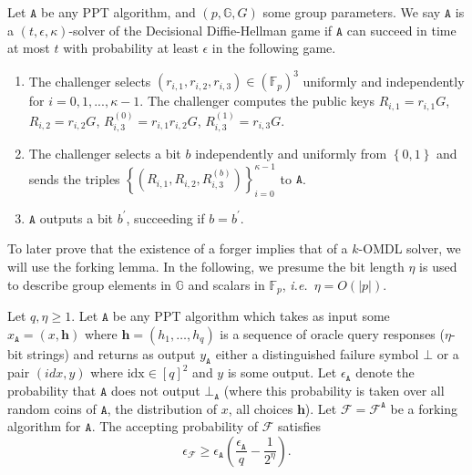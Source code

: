 \documentclass[draft]{llncs} %
\begin{document}
\begin{definition}\label{ddhgame} Let $\texttt{A}$ be any PPT algorithm, and $(p, \mathbb{G}, G)$ some group parameters. We say $\texttt{A}$ is a $(t, \epsilon, \kappa)$-solver of the Decisional Diffie-Hellman game if $\texttt{A}$ can succeed in time at most $t$ with probability at least $\epsilon$ in the following game.
\begin{enumerate}
\item The challenger selects $(r_{i,1}, r_{i,2}, r_{i,3}) \in \left(\mathbb{F}_p\right)^3$ uniformly and independently for $i=0, 1, ..., \kappa-1$. The challenger computes the public keys $R_{i,1} = r_{i,1} G$, $R_{i,2} = r_{i,2}G$, $R_{i,3}^{(0)} = r_{i,1} r_{i,2} G$, $R_{i,3}^{(1)} = r_{i,3} G$.

\item The challenger selects a bit $b$ independently and uniformly from $\left\{0,1\right\}$ and sends the triples $\left\{(R_{i,1}, R_{i,2}, R_{i,3}^{(b)})\right\}_{i=0}^{\kappa - 1}$ to $\texttt{A}$.

\item $\texttt{A}$ outputs a bit $b^\prime$, succeeding if $b = b^\prime$.
\end{enumerate}
\end{definition}

To later prove that the existence of a forger implies that of a $k$-OMDL solver, we will use the forking lemma. In the following, we presume the bit length $\eta$ is used to describe group elements in $\mathbb{G}$ and scalars in $\mathbb{F}_p$, \textit{i.e.}\ $\eta = O(\left|p\right|)$.

\begin{lemma}\label{lem:fork}
Let $q, \eta \geq 1$. Let $\texttt{A}$ be any PPT algorithm which takes as input some $x_\texttt{A} = (x, \textbf{h})$ where $\textbf{h} = (h_1, \ldots, h_q)$ is a sequence of oracle query responses ($\eta$-bit strings) and returns as output $y_{\texttt{A}}$ either a distinguished failure symbol $\bot$ or a pair $(\textit{idx}, y)$ where $\text{idx} \in [q]^2$ and $y$ is some output. Let $\epsilon_{\texttt{A}}$ denote the probability that $\texttt{A}$ does not output $\bot_{\texttt{A}}$ (where this probability is taken over all random coins of $\texttt{A}$, the distribution of $x$, all choices $\textbf{h}$). Let $\mathcal{F} = \mathcal{F}^{\texttt{A}}$ be a forking algorithm for $\texttt{A}$. The accepting probability of $\mathcal{F}$ satisfies \[\epsilon_{\mathcal{F}} \geq \epsilon_{\texttt{A}} \left(\frac{\epsilon_{\texttt{A}}}{q} - \frac{1}{2^\eta}\right).\]
\end{lemma}
\end{document}
